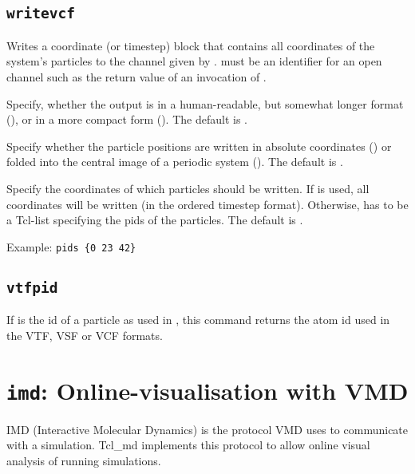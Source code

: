\subsection{\texttt{writevcf}}
{  
  }

Writes a coordinate (or timestep) block that contains all coordinates
of the system's particles to the channel given by .
 must be an identifier for an open channel such as the
return value of an invocation of .

\begin{arguments}
\item[\opt{<short|verbose>}] Specify, whether the output is in a
  human-readable, but somewhat longer format (), or
  in a more compact form (). The default is
  .
  
\item[\opt{<folded|absolute>}] Specify whether the particle positions
  are written in absolute coordinates () or folded
  into the central image of a periodic system (). The
  default is .
  
\item[\opt{pids <\var{pids}|all>}] Specify the coordinates of which
  particles should be written. If  is used, all
  coordinates will be written (in the ordered timestep format).
  Otherwise,  has to be a Tcl-list specifying the pids of
  the particles. The default is .
  
  Example: \verb!pids {0 23 42}!
  
\end{arguments}

\subsection{\texttt{vtfpid}}

If  is the id of a particle as used in \es, this command
returns the atom id used in the VTF, VSF or VCF formats.


\section{\texttt{imd}: Online-visualisation with VMD}
IMD (Interactive Molecular Dynamics) is the protocol VMD uses to
communicate with a simulation. Tcl\_md implements this protocol to
allow online visual analysis of running simulations.

